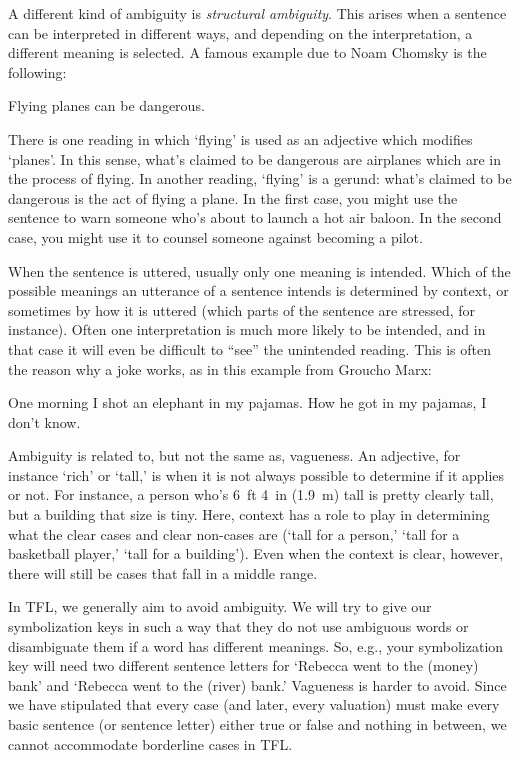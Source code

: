 A different kind of ambiguity is \emph{structural ambiguity}.  This arises when a sentence can be interpreted in different ways, and depending on the interpretation, a different meaning is selected.  A famous example due to Noam Chomsky is the following:
\begin{earg}
	\prem Flying planes can be dangerous.
\end{earg}
There is one reading in which `flying' is used as an adjective which modifies `planes'. In this sense, what's claimed to be dangerous are airplanes which are in the process of flying.  In another reading, `flying' is a gerund: what's claimed to be dangerous is the act of flying a plane.  In the first case, you might use the sentence to warn someone who's about to launch a hot air baloon.  In the second case, you might use it to counsel someone against becoming a pilot.

When the sentence is uttered, usually only one meaning is intended. Which of the possible meanings an utterance of a sentence intends is determined by context, or sometimes by how it is uttered (which parts of the sentence are stressed, for instance). Often one interpretation is much more likely to be intended, and in that case it will even be difficult to ``see'' the unintended reading.  This is often the reason why a joke works, as in this example from Groucho Marx:
\begin{earg}
	\prem One morning I shot an elephant in my pajamas.
	\prem How he got in my pajamas, I don't know.
\end{earg}

Ambiguity is related to, but not the same as, vagueness. An adjective, for instance `rich' or `tall,' is  when it is not always possible to determine if it applies or not.  For instance, a person who's 6~ft 4~in (1.9~m) tall is pretty clearly tall, but a building that size is tiny.  Here, context has a role to play in determining what the clear cases and clear non-cases are (`tall for a person,' `tall for a basketball player,' `tall for a building'). Even when the context is clear, however, there will still be cases that fall in a middle range.

In TFL, we generally aim to avoid ambiguity. We will try to give our symbolization keys in such a way that they do not use ambiguous words or  disambiguate them if a word has different meanings. So, e.g., your symbolization key will need two different sentence letters for `Rebecca went to the (money) bank' and `Rebecca went to the (river) bank.' Vagueness is harder to avoid. Since we have stipulated that every case (and later, every valuation) must make every basic sentence (or sentence letter) either true or false and nothing in between, we cannot accommodate borderline cases in TFL.

